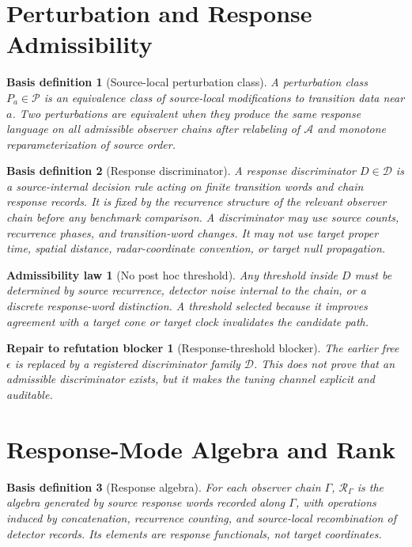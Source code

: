 \documentclass[11pt]{article}
\newcommand{\Sub}{\mathcal{A}}
\newcommand{\RespAlg}{\mathcal{R}_{\Gamma}}
\newtheorem{basisdefinition}{Basis definition}
\newtheorem{admissibility}{Admissibility law}
\newtheorem{repair}{Repair to refutation blocker}
\begin{document}
\section{Perturbation and Response Admissibility}

\begin{basisdefinition}[Source-local perturbation class]
A perturbation class \(P_a\in\mathcal{P}\) is an equivalence class of
source-local modifications to transition data near \(a\). Two perturbations
are equivalent when they produce the same response language on all admissible
observer chains after relabeling of \(\Sub\) and monotone reparameterization
of source order.
\end{basisdefinition}

\begin{basisdefinition}[Response discriminator]
A response discriminator \(D\in\mathcal{D}\) is a source-internal decision
rule acting on finite transition words and chain response records. It is fixed
by the recurrence structure of the relevant observer chain before any
benchmark comparison. A discriminator may use source counts, recurrence
phases, and transition-word changes. It may not use target proper time,
spatial distance, radar-coordinate convention, or target null propagation.
\end{basisdefinition}

\begin{admissibility}[No post hoc threshold]
Any threshold inside \(D\) must be determined by source recurrence, detector
noise internal to the chain, or a discrete response-word distinction. A
threshold selected because it improves agreement with a target cone or target
clock invalidates the candidate path.
\end{admissibility}

\begin{repair}[Response-threshold blocker]
The earlier free \(\epsilon\) is replaced by a registered discriminator
family \(\mathcal{D}\). This does not prove that an admissible discriminator
exists, but it makes the tuning channel explicit and auditable.
\end{repair}

\section{Response-Mode Algebra and Rank}

\begin{basisdefinition}[Response algebra]
For each observer chain \(\Gamma\), \(\RespAlg\) is the algebra generated by
source response words recorded along \(\Gamma\), with operations induced by
concatenation, recurrence counting, and source-local recombination of
detector records. Its elements are response functionals, not target
coordinates.
\end{basisdefinition}
\end{document}
